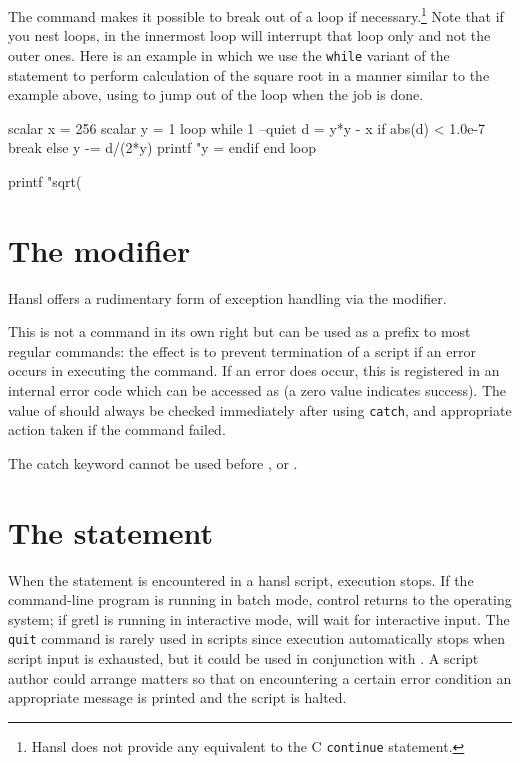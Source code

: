 The  command makes it possible to break out of a loop if
necessary.\footnote{Hansl does not provide any equivalent to the C
  \texttt{continue} statement.} Note that if you nest loops,
 in the innermost loop will interrupt that loop only and
not the outer ones.  Here is an example in which we use the
\texttt{while} variant of the  statement to perform
calculation of the square root in a manner similar to the example
above, using  to jump out of the loop when the job is done.
\begin{code}
scalar x = 256
scalar y = 1
loop while 1 --quiet
    d = y*y - x
    if abs(d) < 1.0e-7
        break
    else
        y -= d/(2*y)
        printf "y = %
    endif
end loop

printf "sqrt(%
\end{code}
\section{The  modifier}

Hansl offers a rudimentary form of exception handling via the
 modifier.

This is not a command in its own right but can be used as a prefix to
most regular commands: the effect is to prevent termination of a
script if an error occurs in executing the command. If an error does
occur, this is registered in an internal error code which can be
accessed as  (a zero value indicates success). The value
of  should always be checked immediately after using
\texttt{catch}, and appropriate action taken if the command failed.

The catch keyword cannot be used before ,  or
.


\section{The  statement}

When the  statement is encountered in a hansl script,
execution stops. If the command-line program  is running
in batch mode, control returns to the operating system; if gretl is
running in interactive mode,  will wait for interactive
input. The \texttt{quit} command is rarely used in scripts since
execution automatically stops when script input is exhausted, but it
could be used in conjunction with . A script author could
arrange matters so that on encountering a certain error condition an
appropriate message is printed and the script is halted.

